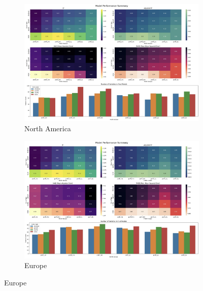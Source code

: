 \documentclass[11pt,english,a4paper,hidelinks]{book}
\begin{document}
\begin{figure}[H]
    \centering
    \begin{subfigure}[b]{0.48\textwidth}
        \centering
        \includegraphics[width=\textwidth]{images/code/models/linear_regression/third_model/USA - performance.png}
        \caption{North America}
    \end{subfigure}
    \hfill
    \begin{subfigure}[b]{0.48\textwidth}
        \centering
        \includegraphics[width=\textwidth]{images/code/models/linear_regression/third_model/EU - performance.png}
        \caption{Europe}
    \end{subfigure}
    \hfill
    
    \vspace{0.5cm}
    

\end{figure}
\end{document}
